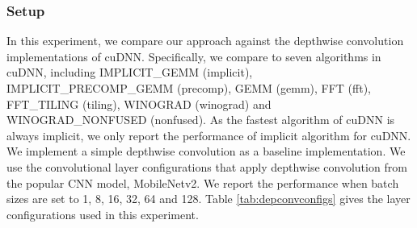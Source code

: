 \subsubsection{Setup} In this experiment, we compare our approach against the depthwise convolution implementations of cuDNN. Specifically, we compare to seven algorithms in cuDNN, including IMPLICIT\_GEMM (implicit), IMPLICIT\_PRECOMP\_GEMM (precomp), GEMM (gemm), FFT (fft), FFT\_TILING (tiling), WINOGRAD (winograd) and WINOGRAD\_NONFUSED (nonfused). 
As the fastest algorithm of cuDNN is always implicit, we only report the performance of implicit algorithm for cuDNN. 
We implement a simple depthwise convolution as a baseline implementation. 
We use the convolutional layer configurations that apply depthwise convolution from the popular CNN model, MobileNetv2. 
We report the performance when batch sizes are set to 1, 8, 16, 32, 64 and 128. 
Table \ref{tab:depconvconfigs} gives the layer configurations used in this experiment.


